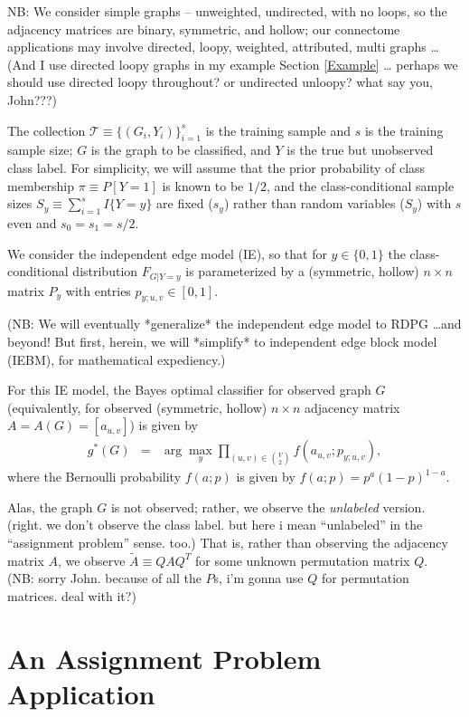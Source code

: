 \documentclass{article}
\newcommand{\mcT}{\mathcal{T}}
\newcommand{\tildeA}{\widetilde{A}}
\begin{document}
NB:
We consider simple graphs -- unweighted, undirected, with no loops,
so the adjacency matrices are binary, symmetric, and hollow;
our connectome applications
may involve {directed, loopy, weighted, attributed, multi} graphs \ldots
(And I use directed loopy graphs in my example Section \ref{Example} \dots
perhaps we should use directed loopy throughout? or undirected unloopy? what say you, John???)

The collection
$\mcT \equiv \{(G_i,Y_i)\}_{i=1}^s$ is the training sample
and $s$ is the training sample size;
$G$ is the graph to be classified,
and $Y$ is the true but unobserved class label.
For simplicity, we will assume that the prior probability of class membership
$\pi \equiv P[Y=1]$ is known to be $1/2$,
and the class-conditional sample sizes $S_y \equiv \sum_{i=1}^s I\{Y=y\}$
are fixed ($s_y$) rather than random variables ($S_y$)
with $s$ even and $s_0=s_1=s/2$.

We consider the independent edge model (IE),
so that for $y \in \{0,1\}$ the class-conditional distribution $F_{G|Y=y}$
is parameterized by a (symmetric, hollow)
$n \times n$ matrix $P_y$ with entries $p_{y;u,v} \in [0,1]$.

(NB: We will eventually *generalize* the independent edge model to RDPG \ldots and beyond!
But first, herein, we will *simplify* to independent edge block model (IEBM), for mathematical expediency.)

For this IE model, the Bayes optimal classifier for observed graph $G$
(equivalently, for observed (symmetric, hollow) $n \times n$ adjacency matrix $A=A(G)=[a_{u,v}]$)
is given by
\begin{eqnarray}
g^*(G) &=& \arg\max_y \prod_{(u,v) \in {V \choose 2}} f(a_{u,v};p_{y;u,v}),
\end{eqnarray}
where the Bernoulli probability $f(a;p)$ is given by
$f(a;p) = p^{a} (1-p)^{1-a}$.

Alas, the graph $G$ is not observed;
rather, we observe the {\em unlabeled} version.
(right. we don't observe the class label.
but here i mean ``unlabeled'' in the ``assignment problem'' sense.
too.)
That is, rather than observing the adjacency matrix $A$,
we observe $\tildeA \equiv QAQ^T$ for some unknown permutation matrix $Q$.
\\
(NB: sorry John.  because of all the $P$s, i'm gonna use $Q$ for permutation matrices.  deal with it?)




\section{An Assignment Problem Application}
\end{document}
